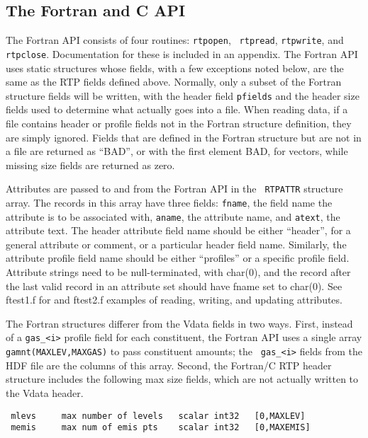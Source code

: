 \documentclass[12pt]{article}
\begin{document}
\subsection{The Fortran and C API}

The Fortran API consists of four routines: {\tt rtpopen}, {\tt
rtpread}, {\tt rtpwrite}, and {\tt rtpclose}.  Documentation for
these is included in an appendix.  The Fortran API uses static
structures whose fields, with a few exceptions noted below, are the
same as the RTP fields defined above.  Normally, only a subset of
the Fortran structure fields will be written, with the header field
{\tt pfields} and the header size fields used to determine what
actually goes into a file.  When reading data, if a file contains
header or profile fields not in the Fortran structure definition,
they are simply ignored.  Fields that are defined in the Fortran
structure but are not in a file are returned as ``BAD'', or with the
first element BAD, for vectors, while missing size fields are
returned as zero.

Attributes are passed to and from the Fortran API in the {\tt
RTPATTR} structure array.  The records in this array have three
fields: {\tt fname}, the field name the attribute is to be
associated with, {\tt aname}, the attribute name, and {\tt atext},
the attribute text.  The header attribute field name should be
either ``header'', for a general attribute or comment, or a
particular header field name.  Similarly, the attribute profile
field name should be either ``profiles'' or a specific profile
field.  Attribute strings need to be null-terminated, with char(0),
and the record after the last valid record in an attribute set
should have fname set to char(0).  See ftest1.f for and ftest2.f
examples of reading, writing, and updating attributes.

The Fortran structures differer from the Vdata fields in two ways.
First, instead of a {\tt gas\_<i>} profile field for each
constituent, the Fortran API uses a single array {\tt
gamnt(MAXLEV,MAXGAS)} to pass constituent amounts; the {\tt
gas\_<i>} fields from the HDF file are the columns of this array.
Second, the Fortran/C RTP header structure includes the following
max size fields, which are not actually written to the Vdata header.

\begin{verbatim}
 mlevs     max number of levels   scalar int32   [0,MAXLEV]
 memis     max num of emis pts    scalar int32   [0,MAXEMIS]
\end{verbatim}
\end{document}
